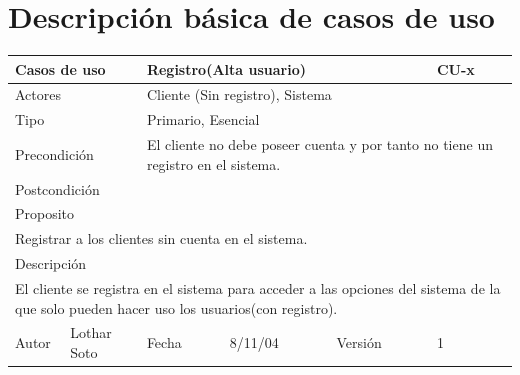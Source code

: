 \documentclass{article}
\begin{document}
\section{Descripción básica de casos de uso}
\begin{table}[h]
\begin{tabular}{|l|l|l|l|l|l|}
\hline
\multicolumn{2}{|p{2cm}|}{Casos de uso}  & \multicolumn{3}{p{7cm}|}{Registro(Alta usuario)} & CU-x \\
\hline
\multicolumn{2}{|p{2cm}|}{Actores}       & \multicolumn{4}{p{8cm}|}{Cliente (Sin registro), Sistema}        \\
\hline
\multicolumn{2}{|p{2cm}|}{Tipo}          & \multicolumn{4}{p{8cm}|}{Primario, Esencial}        \\
\hline
\multicolumn{2}{|p{2cm}|}{Precondición}  & \multicolumn{4}{p{8cm}|}{El cliente no debe poseer cuenta y por tanto no tiene un registro en el sistema.}        \\
\hline
\multicolumn{2}{|p{2cm}|}{Postcondición} & \multicolumn{4}{p{8cm}|}{}        \\
\hline
\multicolumn{6}{|p{10cm}|}{Proposito}                                   \\
\hline
\multicolumn{6}{|p{10cm}|}{Registrar a los clientes sin cuenta en el sistema.}                                            \\
\hline
\multicolumn{6}{|p{10cm}|}{Descripción}                                 \\
\hline
\multicolumn{6}{|p{10cm}|}{El cliente se registra en el sistema para acceder a las opciones del sistema de la que solo pueden hacer uso los usuarios(con registro).}                                            \\
\hline
Autor              &     Lothar Soto         & Fecha    &  8/11/04   &   Versión  & 1\\     
\hline
\end{tabular}
\end{table}
\end{document}
